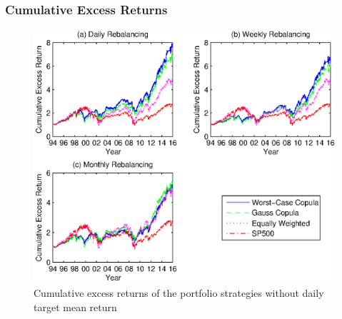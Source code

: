\documentclass[pdf,9pt,xcolor=dvipsnames,hide notes]{beamer}
\begin{document}
%	
%		
%		
%		
%		
%		
%	

\begin{frame}[label=frame10]
\frametitle{Cumulative Excess Returns}

\begin{figure}[htbp]
\centering
\includegraphics[scale=0.58]{fig1_nogrid.eps}
\caption{\scriptsize Cumulative excess returns of the portfolio strategies without daily target mean return }
\label{fig:fig01}
\end{figure}

\end{frame}
\end{document}
